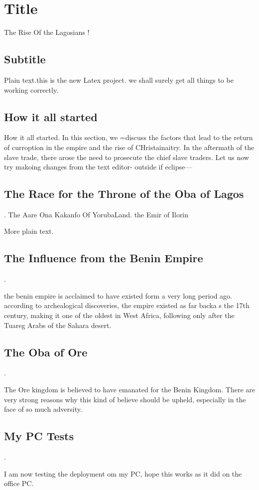 \documentclass{article}
\begin{document}
\section{Title}The Rise Of the Lagosians !

\subsection{Subtitle}

Plain text.this is the new Latex project. we shall surely get all things to be
working correctly.

\subsection{How it all started}How it all started. In this section, we =discuss
the factors that lead to the return of curroption in the empire and the rise of
CHristainaitry. In the aftermath of the slave trade, there arose the need to
prosecute the chief slave traders.
Let us now try makoing changes from the text editor- outside if eclipse---


\subsection{The Race for the Throne of the Oba of Lagos}. The
Aare Ona Kakanfo Of YorubaLand. the Emir of Ilorin

More plain text.


\subsection{ The Influence from the Benin Empire}.

the benin empire is acclaimed to have existed form a very long period ago. according to archealogical discoveries, the empire existed as far backa s the 17th century, making it one of the oldest in West Africa, following only after the Tuareg Arabs of the Sahara desert.

\subsection{ The Oba of Ore}. 

The Ore kingdom is believed to have emanated for the Benin Kingdom. There are very strong reasons why this kind of believe should be upheld, especially in the face of so much adversity. 

\subsection{ My PC Tests}. 

I am now testing the deployment om my PC, hope this works as it did on the
office PC.
\end{document}
